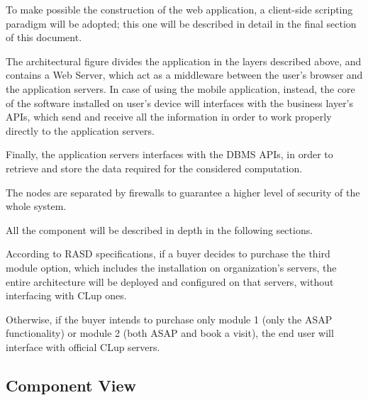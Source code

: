 \documentclass[table, 12pt]{article}
\begin{document}
To make possible the construction of the web application, a client-side scripting paradigm will be adopted; this one will be described in detail in the final section of this document.

The architectural figure divides the application in the layers described above, and contains a Web Server, which act as a middleware between the user's browser and the application servers.
In case of using the mobile application, instead, the core of the software installed on user's device will interfaces with the business layer's APIs, which send and receive all the information in order to work properly directly to the application servers.

Finally, the application servers interfaces with the DBMS APIs, in order to retrieve and store the data required for the considered computation.

The nodes are separated by firewalls to guarantee a higher level of security of the whole system.

All the component will be described in depth in the following sections.

According to RASD specifications, if a buyer decides to purchase the third module option, which includes the installation on organization's servers, the entire architecture will be deployed and configured on that servers, without interfacing with CLup ones.

Otherwise, if the buyer intends to purchase only module 1 (only the ASAP functionality) or module 2 (both ASAP and book a visit), the end user will interface with official CLup servers.

\subsection{Component View}
\end{document}
